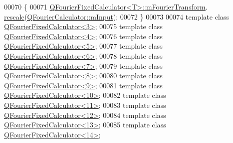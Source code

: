 \begin{DoxyCode}
00070 \{
00071     \hyperlink{a00053}{QFourierFixedCalculator<T>::mFourierTransform}.
      \hyperlink{a00053_a28f08b0466a5fe5ad7b7b0fe591e9544}{rescale}(\hyperlink{a00052_ac14a86f60463eed27b3b1beab135e689}{QFourierCalculator::mInput});
00072 \}
00073 
00074 \textcolor{keyword}{template} \textcolor{keyword}{class }\hyperlink{a00053}{QFourierFixedCalculator<3>};
00075 \textcolor{keyword}{template} \textcolor{keyword}{class }\hyperlink{a00053}{QFourierFixedCalculator<4>};
00076 \textcolor{keyword}{template} \textcolor{keyword}{class }\hyperlink{a00053}{QFourierFixedCalculator<5>};
00077 \textcolor{keyword}{template} \textcolor{keyword}{class }\hyperlink{a00053}{QFourierFixedCalculator<6>};
00078 \textcolor{keyword}{template} \textcolor{keyword}{class }\hyperlink{a00053}{QFourierFixedCalculator<7>};
00079 \textcolor{keyword}{template} \textcolor{keyword}{class }\hyperlink{a00053}{QFourierFixedCalculator<8>};
00080 \textcolor{keyword}{template} \textcolor{keyword}{class }\hyperlink{a00053}{QFourierFixedCalculator<9>};
00081 \textcolor{keyword}{template} \textcolor{keyword}{class }\hyperlink{a00053}{QFourierFixedCalculator<10>};
00082 \textcolor{keyword}{template} \textcolor{keyword}{class }\hyperlink{a00053}{QFourierFixedCalculator<11>};
00083 \textcolor{keyword}{template} \textcolor{keyword}{class }\hyperlink{a00053}{QFourierFixedCalculator<12>};
00084 \textcolor{keyword}{template} \textcolor{keyword}{class }\hyperlink{a00053}{QFourierFixedCalculator<13>};
00085 \textcolor{keyword}{template} \textcolor{keyword}{class }\hyperlink{a00053}{QFourierFixedCalculator<14>};
\end{DoxyCode}
